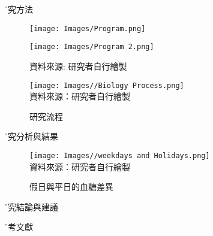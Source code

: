 \documentclass[12pt]{article}
\begin{document}
\h{研究方法}

    \begin{figure}[htbp]
    \centering
    \begin{minipage}[t]{0.5\textwidth}
    \centering
    \texttt{[image: Images/Program.png]}
    \caption{}
    \end{minipage}
    \begin{minipage}[t]{0.49\textwidth}
    \centering
    \texttt{[image: Images/Program 2.png]}
    \caption{}
    資料來源: 研究者自行繪製
    \end{minipage}
    \end{figure}
    
\clearpage


        
        
    \begin{figure}[H] %
    \captionsetup{format=hang, singlelinecheck=off}
    \centering %
    \vspace{0pt}
    \begin{minipage}[t]{0.85\textwidth}
    \caption{研究流程}
    \centering %
    \texttt{[image: Images//Biology Process.png]}\\[12pt]
    資料來源：研究者自行繪製
    \label{fig.5}
    \end{minipage}
    \end{figure}





    \h{研究分析與結果}
    \begin{figure}[H] %
    \captionsetup{format=hang, singlelinecheck=off}
    \centering %
    \vspace{0pt}
    \begin{minipage}[t]{0.9\textwidth}
    \caption{假日與平日的血糖差異}
    \centering %
    \texttt{[image: Images//weekdays and Holidays.png]}\\[12pt]
    資料來源：研究者自行繪製
    \label{fig.6}
    \end{minipage}
    \end{figure}
    
    
    
    \hhtext{
    
    
    }
    
    \h{研究結論與建議}

\clearpage %
\h{參考文獻}

\begin{enumerate}[(1)]

\end{enumerate}
\end{document}
